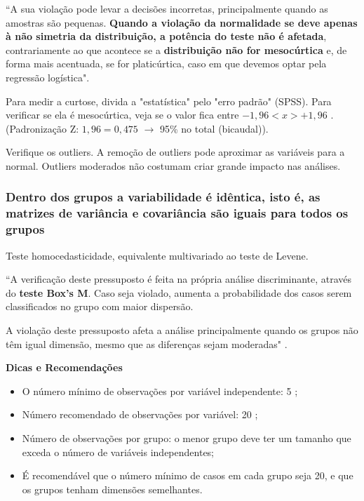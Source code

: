 			``A sua violação pode levar a decisões incorretas, principalmente quando as amostras são pequenas. \textbf{Quando a violação da normalidade se deve apenas à não simetria da distribuição, a potência do teste não é afetada}, contrariamente ao que acontece se a \textbf{distribuição não for mesocúrtica} e, de forma mais acentuada, se for platicúrtica, caso em que devemos optar pela regressão logística". \cite{torres}

			Para medir a curtose, divida a "estatística" pelo "erro padrão" (SPSS). Para verificar se ela é mesocúrtica, veja se o valor fica entre $-1,96 < x > +1,96$ . (Padronização Z: $1,96 = 0,475$ $\rightarrow$ 95\% no total (bicaudal)).

			Verifique os outliers. A remoção de outliers pode aproximar as variáveis para a normal. Outliers moderados não costumam criar grande impacto nas análises.

		\subsubsection{Dentro dos grupos a variabilidade é idêntica, isto é, as matrizes de variância e covariância são iguais para todos os grupos}

			Teste homocedasticidade, equivalente multivariado ao teste de Levene.

			``A verificação deste pressuposto é feita na própria análise discriminante, através do \textbf{teste Box’s M}. Caso seja violado, aumenta a probabilidade dos casos serem classificados no grupo com maior dispersão.

			A violação deste pressuposto afeta a análise principalmente quando os grupos não têm igual dimensão, mesmo que as diferenças sejam moderadas" \cite{torres}.

			\bigskip

			\textbf{Dicas e Recomendações \cite{torres}}

				\begin{itemize}
					\item O número mínimo de observações por variável independente: 5 ;
					\item Número recomendado de observações por variável: 20 ;
					\item Número de observações por grupo: o menor grupo deve ter um tamanho que exceda o número de variáveis independentes;
					\item É recomendável que o número mínimo de casos em cada grupo seja 20, e que os grupos tenham dimensões semelhantes.
				\end{itemize}
				
